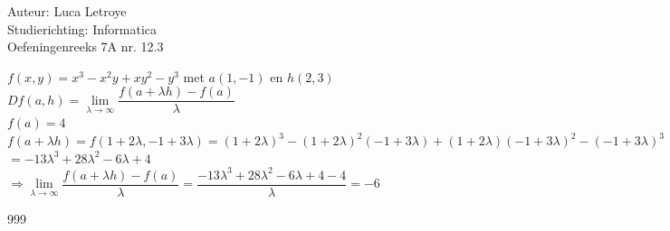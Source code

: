 \documentclass[a4paper]{article}
\begin{document}
  
\noindent \large Auteur: Luca Letroye \\
\noindent \large Studierichting: Informatica\\
\noindent \large Oefeningenreeks 7A nr. 12.3\\

\medskip
\normalsize

$f(x,y) = x^3-x^2y+xy^2-y^3 $ met $a(1,-1)$ en $ h(2,3)$\\

$Df(a,h) = \lim\limits_{\lambda \rightarrow \infty} \dfrac{f(a+\lambda h)- f(a)}{\lambda}$\\

$f(a) = 4$\\

$f(a+\lambda h) = f(1+2\lambda, -1+3\lambda) = (1+2\lambda)^3-(1+2\lambda)^2(-1+3\lambda)+(1+2\lambda)(-1+3\lambda)^2 -(-1+3\lambda)^3$\\

$= -13\lambda^3+28\lambda^2-6\lambda+4$\\

$\Rightarrow \lim\limits_{\lambda \rightarrow \infty} \dfrac{f(a+\lambda h)- f(a)}{\lambda} = \dfrac{-13\lambda^3+28\lambda^2-6\lambda+4 - 4}{\lambda} = -6$\\




\begin{thebibliography}{999}
\end{thebibliography}
\end{document}
